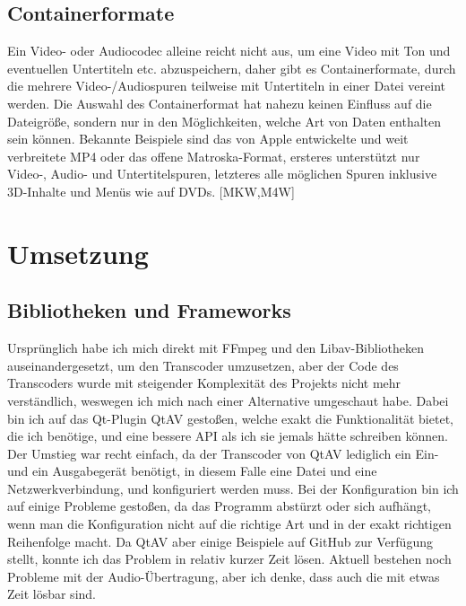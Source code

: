 \documentclass{article}
\begin{document}
    \subsection{Containerformate}\label{subsec:containerformate}

    Ein Video- oder Audiocodec alleine reicht nicht aus, um eine Video mit
    Ton und eventuellen Untertiteln etc. abzuspeichern, daher gibt es
    Containerformate, durch die mehrere Video-/Audiospuren teilweise mit
    Untertiteln in einer Datei vereint werden. Die Auswahl des
    Containerformat hat nahezu keinen Einfluss auf die Dateigröße, sondern
    nur in den Möglichkeiten, welche Art von Daten enthalten sein können.
    Bekannte Beispiele sind das von Apple entwickelte und weit verbreitete
    MP4 oder das offene Matroska-Format, ersteres unterstützt nur Video-,
    Audio- und Untertitelspuren, letzteres alle möglichen Spuren inklusive 3D-Inhalte und
    Menüs wie auf DVDs. [MKW,M4W]

    \newpage


    \section{Umsetzung}\label{sec:umsetzung}

    \subsection{Bibliotheken und Frameworks}\label{subsec:bibliotheken-und-frameworks}

    Ursprünglich habe ich mich direkt mit FFmpeg und den Libav-Bibliotheken
    auseinandergesetzt, um den Transcoder umzusetzen, aber der Code des
    Transcoders wurde mit steigender Komplexität des Projekts nicht mehr
    verständlich, weswegen ich mich nach einer Alternative umgeschaut habe.
    Dabei bin ich auf das Qt-Plugin QtAV gestoßen, welche exakt die
    Funktionalität bietet, die ich benötige, und eine bessere API als ich
    sie jemals hätte schreiben können. Der Umstieg war recht einfach, da der
    Transcoder von QtAV lediglich ein Ein- und ein Ausgabegerät benötigt, in
    diesem Falle eine Datei und eine Netzwerkverbindung, und konfiguriert
    werden muss. Bei der Konfiguration bin ich auf einige Probleme gestoßen,
    da das Programm abstürzt oder sich aufhängt, wenn man die Konfiguration
    nicht auf die richtige Art und in der exakt richtigen Reihenfolge macht.
    Da QtAV aber einige Beispiele auf GitHub zur Verfügung stellt, konnte
    ich das Problem in relativ kurzer Zeit lösen. Aktuell bestehen noch
    Probleme mit der Audio-Übertragung, aber ich denke, dass auch die mit
    etwas Zeit lösbar sind.
\end{document}
